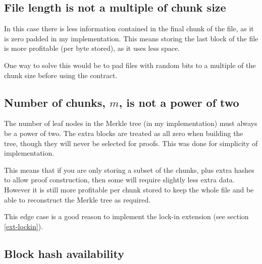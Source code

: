\documentclass[12pt,a4paper,twoside,openright]{report}
\begin{document}
\subsection{File length is not a multiple of chunk size}
\label{file-len-chunk-size}

In this case there is less information contained in the final chunk of the file, as it is zero padded in my implementation.
This means storing the last block of the file is more profitable (per byte stored), as it uses less space.

One way to solve this would be to pad files with random bits to a multiple of the chunk size before using the contract.

\subsection{Number of chunks, $m$, is not a power of two}
\label{file-len-chunk-num}

The number of leaf nodes in the Merkle tree (in my implementation) must always be a power of two.
The extra blocks are treated as all zero when building the tree, though they will never be selected for proofs.
This was done for simplicity of implementation.

This means that if you are only storing a subset of the chunks, plus extra hashes to allow proof construction,
then some will require slightly less extra data.
However it is still more profitable per chunk stored to keep the whole file and be able to reconstruct the Merkle tree as required.

%
This edge case is a good reason to implement the lock-in extension (see section \ref{ext-lockin}).

\subsection{Block hash availability}
\end{document}
